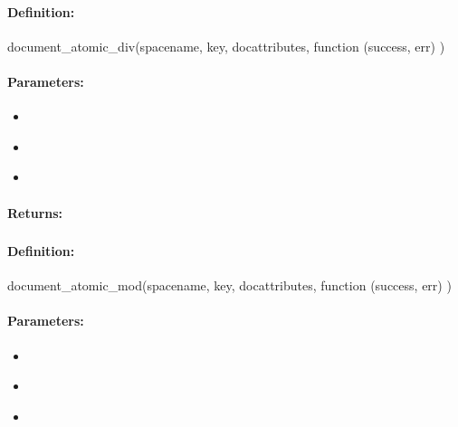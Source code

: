 \paragraph{Definition:}
\begin{javascriptcode}
document_atomic_div(spacename, key, docattributes, function (success, err) {})
\end{javascriptcode}
\paragraph{Parameters:}
\begin{itemize}[noitemsep]
\item {}\\

\item {}\\

\item {}\\

\end{itemize}

\paragraph{Returns:}


\pagebreak
\subsubsection{}
\label{api:nodejs:document_atomic_mod}


\paragraph{Definition:}
\begin{javascriptcode}
document_atomic_mod(spacename, key, docattributes, function (success, err) {})
\end{javascriptcode}
\paragraph{Parameters:}
\begin{itemize}[noitemsep]
\item {}\\

\item {}\\

\item {}\\

\end{itemize}

